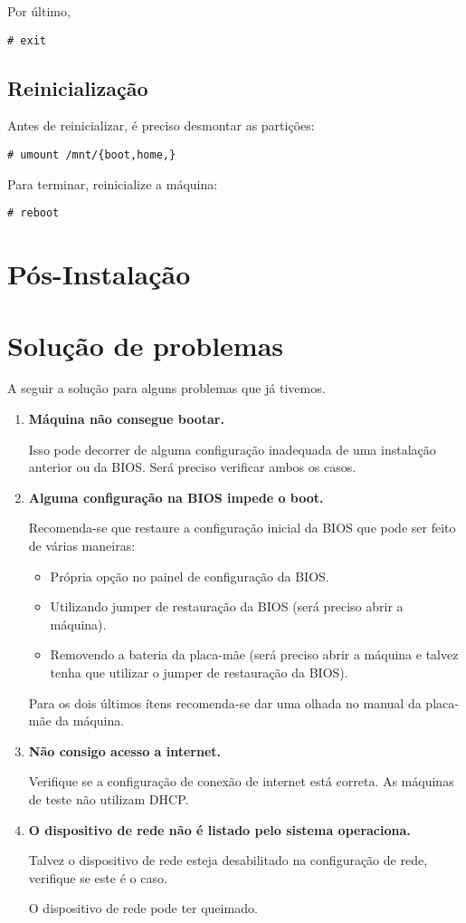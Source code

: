 \documentclass[A4paper]{article}
\begin{document}
Por último,
\begin{lstlisting}
# exit
\end{lstlisting}

\subsection{Reinicialização}
Antes de reinicializar, é preciso desmontar as partições:
\begin{lstlisting}
# umount /mnt/{boot,home,}
\end{lstlisting}

Para terminar, reinicialize a máquina:
\begin{lstlisting}
# reboot
\end{lstlisting}

\section{Pós-Instalação}

\section{Solução de problemas}
A seguir a solução para alguns problemas que já tivemos.

\begin{enumerate}
  \item \textbf{Máquina não consegue bootar.}

    Isso pode decorrer de alguma configuração inadequada de uma instalação
    anterior ou da BIOS. Será preciso verificar ambos os casos.

  \item \textbf{Alguma configuração na BIOS impede o boot.}

    Recomenda-se que restaure a configuração inicial da BIOS que pode ser feito
    de várias maneiras:
    \begin{itemize}
      \item Própria opção no painel de configuração da BIOS.
      \item Utilizando jumper de restauração da BIOS (será preciso abrir a
        máquina).
      \item Removendo a bateria da placa-mãe (será preciso abrir a máquina e
        talvez tenha que utilizar o jumper de restauração da BIOS).
    \end{itemize}
    Para os dois últimos ítens recomenda-se dar uma olhada no manual da
    placa-mãe da máquina.

  \item \textbf{Não consigo acesso a internet.}

    Verifique se a configuração de conexão de internet está correta. As máquinas
    de teste não utilizam DHCP.

  \item \textbf{O dispositivo de rede não é listado pelo sistema operaciona.}

    Talvez o dispositivo de rede esteja desabilitado na configuração de rede,
    verifique se este é o caso.

    O dispositivo de rede pode ter queimado.
\end{enumerate}
\end{document}
